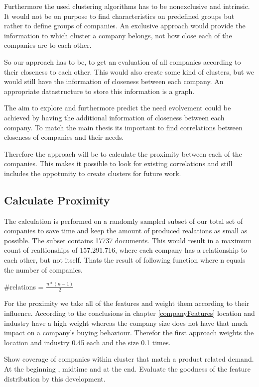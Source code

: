 Furthermore the used clustering algorithms has to be nonexclusive and intrinsic. It would not be on purpose to find
characteristics on predefined groups but rather to define groups of companies. An exclusive approach would provide
the information to which cluster a company belongs, not how close each of the companies are to each other.

So our approach has to be, to get an evaluation of all companies according to their closeness to each other. This
would also create some kind of clusters, but we would still have the information of closeness between each company.
An appropriate datastructure to store this information is a graph.

The aim to explore and furthermore predict the need evolvement could be achieved by having the additional
information of closeness between each company. To match the main thesis its important to find correlations between
closeness of companies and their needs.

Therefore the approach will be to calculate the proximity between each of the companies. This makes it possible to
look for existing correlations and still includes the oppotunity to create clusters for future work.

\subsection{Calculate Proximity}
The calculation is performed on a randomly sampled subset of our total set of companies to save time and keep the amount
of produced realations as small as possible. The subset contains 17737 documents. This would result in a maximum count of
realtionships of 157.291.716, where each company has a relationship to each other, but not itself. Thats the result of following
function where n equals the number of companies.

\begin{center}
  { \Large #relations \LARGE = $\frac{n*(n-1)}{2}$}
\end{center}

For the proximity we take all of the features and weight them according to their influence. According to the conclusions in chapter
\ref{companyFeatures} location and industry have a high weight whereas the company size does not have that much impact
on a company's buying behaviour. Therefor the first approach weights the location and industry 0.45 each and the size 0.1 times.

Show coverage of companies within cluster that match a product related demand. At the beginning , midtime and at the end.
Evaluate the goodness of the feature distribution by this development.

